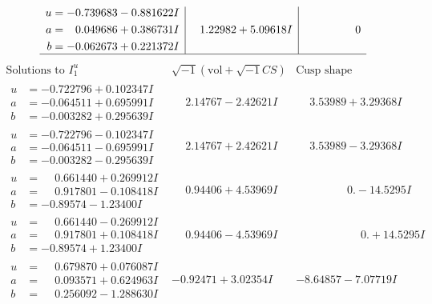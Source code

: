 \documentclass[1p]{elsarticle_modified}
\theoremstyle{definition}
\newcommand{\I}{\sqrt{-1}}
\begin{document}
$$\begin{array}{c|c|c}
\begin{aligned}
u &= -0.739683 - 0.881622 I \\
a &= \phantom{-}0.049686 + 0.386731 I \\
b &= -0.062673 + 0.221372 I\end{aligned}
 & \phantom{-}1.22982 + 5.09618 I & \phantom{-0.000000 } 0\\
 \hline 
 \end{array}$$\newpage$$\begin{array}{c|c|c}  
\text{Solutions to }I^u_{1}& \I (\text{vol} + \sqrt{-1}CS) & \text{Cusp shape}\\
 \hline 
\begin{aligned}
u &= -0.722796 + 0.102347 I \\
a &= -0.064511 + 0.695991 I \\
b &= -0.003282 + 0.295639 I\end{aligned}
 & \phantom{-}2.14767 - 2.42621 I & \phantom{-}3.53989 + 3.29368 I \\ \hline\begin{aligned}
u &= -0.722796 - 0.102347 I \\
a &= -0.064511 - 0.695991 I \\
b &= -0.003282 - 0.295639 I\end{aligned}
 & \phantom{-}2.14767 + 2.42621 I & \phantom{-}3.53989 - 3.29368 I \\ \hline\begin{aligned}
u &= \phantom{-}0.661440 + 0.269912 I \\
a &= \phantom{-}0.917801 - 0.108418 I \\
b &= -0.89574 - 1.23400 I\end{aligned}
 & \phantom{-}0.94406 + 4.53969 I & \phantom{-0.000000 } 0. - 14.5295 I \\ \hline\begin{aligned}
u &= \phantom{-}0.661440 - 0.269912 I \\
a &= \phantom{-}0.917801 + 0.108418 I \\
b &= -0.89574 + 1.23400 I\end{aligned}
 & \phantom{-}0.94406 - 4.53969 I & \phantom{-0.000000 -}0. + 14.5295 I \\ \hline\begin{aligned}
u &= \phantom{-}0.679870 + 0.076087 I \\
a &= \phantom{-}0.093571 + 0.624963 I \\
b &= \phantom{-}0.256092 - 1.288630 I\end{aligned}
 & -0.92471 + 3.02354 I & -8.64857 - 7.07719 I \\ \hline\begin{aligned}

\end{aligned}
\end{array}$$
\end{document}
